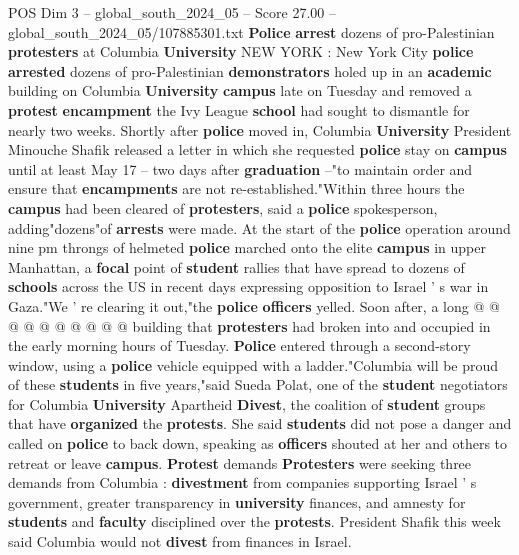 \begin{textsample}{POS Dim 3 – global\_south\_2024\_05 – Score 27.00 – global\_south\_2024\_05/107885301.txt}  \label{ex:f3_pos_101}
\textbf{Police} \textbf{arrest} dozens of pro-Palestinian \textbf{protesters} at Columbia \textbf{University} NEW YORK : New York City \textbf{police} \textbf{arrested} dozens of pro-Palestinian \textbf{demonstrators} holed up in an \textbf{academic} building on Columbia \textbf{University} \textbf{campus} late on Tuesday and removed a \textbf{protest} \textbf{encampment} the Ivy League \textbf{school} had sought to dismantle for nearly two weeks.
Shortly after \textbf{police} moved in, Columbia \textbf{University} President Minouche Shafik released a letter in which she requested \textbf{police} stay on \textbf{campus} until at least May 17 -- two days after \textbf{graduation} --"to maintain order and ensure that \textbf{encampments} are not re-established."Within three hours the \textbf{campus} had been cleared of \textbf{protesters}, said a \textbf{police} spokesperson, adding"dozens"of \textbf{arrests} were made.
At the start of the \textbf{police} operation around nine pm throngs of helmeted \textbf{police} marched onto the elite \textbf{campus} in upper Manhattan, a \textbf{focal} point of \textbf{student} rallies that have spread to dozens of \textbf{schools} across the US in recent days expressing opposition to Israel ' s war in Gaza."We ' re clearing it out,"the \textbf{police} \textbf{officers} yelled.
Soon after, a long @ @ @ @ @ @ @ @ @ @ building that \textbf{protesters} had broken into and occupied in the early morning hours of Tuesday. \textbf{Police} entered through a second-story window, using a \textbf{police} vehicle equipped with a ladder."Columbia will be proud of these \textbf{students} in five years,"said Sueda Polat, one of the \textbf{student} negotiators for Columbia \textbf{University} Apartheid \textbf{Divest}, the coalition of \textbf{student} groups that have \textbf{organized} the \textbf{protests}.
She said \textbf{students} did not pose a danger and called on \textbf{police} to back down, speaking as \textbf{officers} shouted at her and others to retreat or leave \textbf{campus}. \textbf{Protest} demands \textbf{Protesters} were seeking three demands from Columbia : \textbf{divestment} from companies supporting Israel ' s government, greater transparency in \textbf{university} finances, and amnesty for \textbf{students} and \textbf{faculty} disciplined over the \textbf{protests}.
President Shafik this week said Columbia would not \textbf{divest} from finances in Israel.

\end{textsample}
